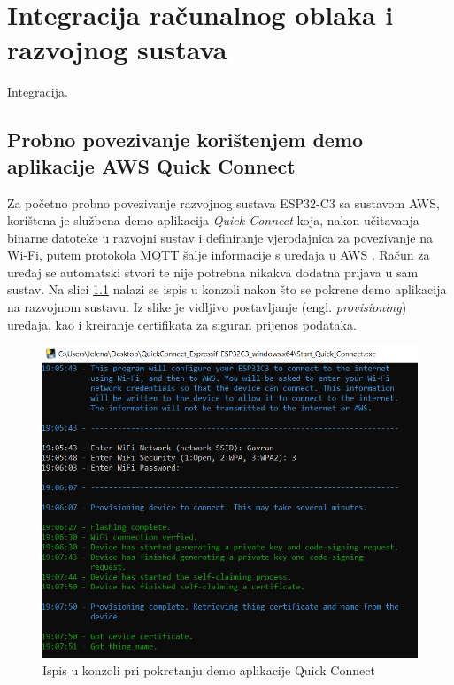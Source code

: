\chapter{Integracija računalnog oblaka i razvojnog sustava}

Integracija.

\section{Probno povezivanje korištenjem demo aplikacije AWS Quick Connect}

Za početno probno povezivanje razvojnog sustava ESP32-C3 sa sustavom AWS, korištena je službena demo aplikacija \textit{Quick Connect} koja, nakon učitavanja binarne datoteke u razvojni sustav i definiranje vjerodajnica za povezivanje na Wi-Fi, putem protokola MQTT šalje informacije s uređaja u AWS \cite{quick_connect_app}. Račun za uređaj se automatski stvori te nije potrebna nikakva dodatna prijava u sam sustav. Na slici \ref{fig:aws_esp32_easy_connect} nalazi se ispis u konzoli nakon što se pokrene demo aplikacija na razvojnom sustavu. Iz slike je vidljivo postavljanje (engl. \textit{provisioning}) uređaja, kao i kreiranje certifikata za siguran prijenos podataka.

\begin{figure}[ht]
	\centering
	\includegraphics[scale=0.5]{imgs/aws_esp32_easy_connect}
	\caption{Ispis u konzoli pri pokretanju demo aplikacije Quick Connect}
	\label{fig:aws_esp32_easy_connect}
\end{figure}

